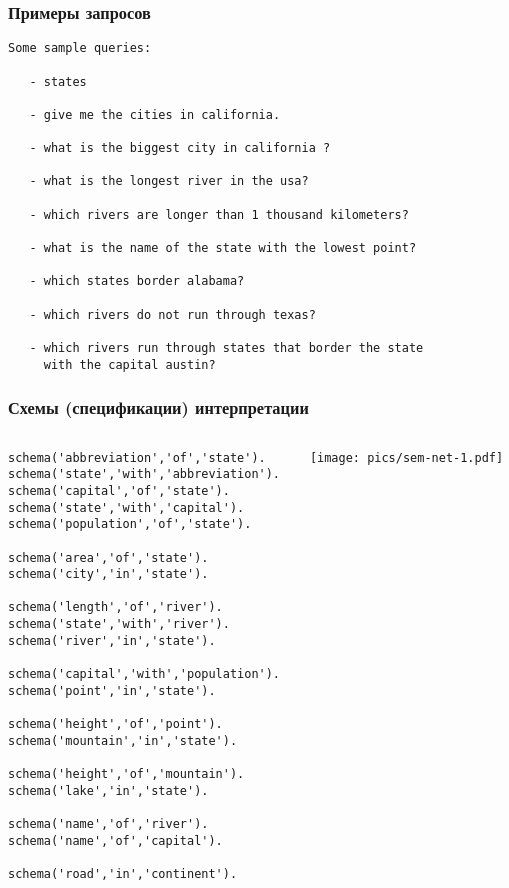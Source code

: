 \documentclass[10pt]{beamer}
\begin{document}
\begin{frame}[fragile]
   \frametitle{Примеры запросов}
{\ttfamily\footnotesize
\begin{verbatim}
Some sample queries:

   - states

   - give me the cities in california.

   - what is the biggest city in california ?

   - what is the longest river in the usa?

   - which rivers are longer than 1 thousand kilometers?

   - what is the name of the state with the lowest point?

   - which states border alabama?

   - which rivers do not run through texas?

   - which rivers run through states that border the state
     with the capital austin?
\end{verbatim}}
\end{frame}

\begin{frame}[fragile]
  \frametitle{Схемы (спецификации) интерпретации}
  \begin{columns}
    \begin{column}{0.4\textwidth}
\begin{verbatim}
schema('abbreviation','of','state').
schema('state','with','abbreviation').
schema('capital','of','state').
schema('state','with','capital').
schema('population','of','state').

schema('area','of','state').
schema('city','in','state').

schema('length','of','river').
schema('state','with','river').
schema('river','in','state').

schema('capital','with','population').
schema('point','in','state').

schema('height','of','point').
schema('mountain','in','state').

schema('height','of','mountain').
schema('lake','in','state').

schema('name','of','river').
schema('name','of','capital').

schema('road','in','continent').
\end{verbatim}
    \end{column}
    \begin{column}{0.6\textwidth}
      \texttt{[image: pics/sem-net-1.pdf]}
    \end{column}
  \end{columns}
\end{frame}
\end{document}
